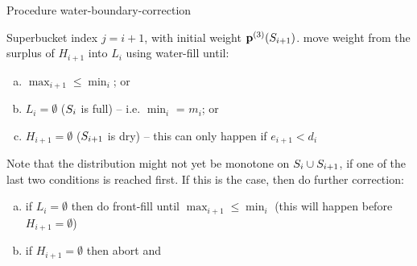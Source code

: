 \begin{algorithm}[H]
  \caption{Procedure \textsf{water-boundary-correction}}
  \begin{algorithmic}[1]
    \Require Superbucket index $j=i+1$, {with initial weight $\mathbf{p}^{(3)}(S_{i+1})$.}
   \State move weight from the surplus of $H_{i+1}$ into $L_{i}$ using \textsf{water-fill} until:
    \begin{enumerate}[(a)]
      \item $\max_{i+1} \leq \min_i$; or
      \item $L_{i}=\emptyset$ ($S_i$ is full) -- i.e. $\min_i$ = $m_i$; or
      \item $H_{i+1}=\emptyset$ ($S_{i+1}$ is dry) -- this can only happen if $e_{i+1} < d_i$ 
    \end{enumerate}
  \State Note that the distribution might not yet be monotone on $S_i\cup S_{i+1}$, if one of the last two conditions is reached first. If this is the case, then do further correction:
    \begin{enumerate}[(a)]
      \item if $L_{i}=\emptyset$  then do \textsf{front-fill} until $\max_{i+1} \leq \min_i$  (this will happen before $H_{i+1}=\emptyset$)
      \item if $H_{i+1}=\emptyset$ then abort and \Return \fail {}
          \end{enumerate}
  \end{algorithmic}
  \end{algorithm}

